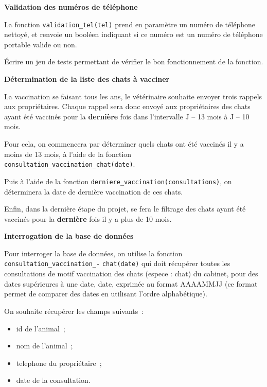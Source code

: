 \documentclass[a4paper,12pt]{article}
\begin{document}
\appel

\textbf{Validation des numéros de téléphone}

La fonction \verb|validation_tel(tel)| prend en paramètre un numéro de
téléphone nettoyé, et renvoie un booléen indiquant si ce numéro est un numéro
de téléphone portable valide ou non.

\begin{question}
    Écrire un jeu de tests permettant de vérifier le bon fonctionnement de la
    fonction.
\end{question}

\appel

\textbf{Détermination de la liste des chats à vacciner}

La vaccination se faisant tous les ans, le vétérinaire souhaite envoyer trois
rappels aux propriétaires. Chaque rappel sera donc envoyé aux propriétaires des
chats ayant été vaccinés pour la \textbf{dernière} fois dans l’intervalle
J -- 13 mois à J -- 10 mois.

Pour cela, on commencera par déterminer quels chats ont été vaccinés il y a
moins de 13 mois, à l’aide de la fonction
\verb|consultation_vaccination_chat(date)|.

Puis à l’aide de la fonction \verb|derniere_vaccination(consultations)|, on
déterminera la date de dernière vaccination de ces chats.

Enfin, dans la dernière étape du projet, se fera le filtrage des chats ayant été vaccinés pour la
\textbf{dernière} fois il y a plus de 10 mois.

\textbf{Interrogation de la base de données}

Pour interroger la base de données, on utilise la fonction
\verb|consultation_vaccination_-| \verb|chat(date)| qui doit récupérer toutes
les consultations de motif vaccination des chats (espece : chat) du cabinet,
pour des dates supérieures à une date, date, exprimée au format AAAAMMJJ (ce
format permet de comparer des dates en utilisant l’ordre alphabétique).

\newpage

On souhaite récupérer les champs suivants :

\begin{itemize}
    \item id de l’animal ;
    \item nom de l’animal ;
    \item telephone du propriétaire ;
    \item date de la consultation.
\end{itemize}
\end{document}
